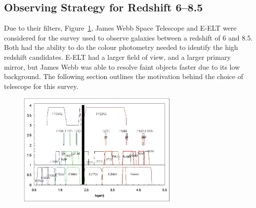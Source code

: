 
\subsection{Observing Strategy for Redshift 6--8.5} %
\label{sec:observing_strategy_for_redshift_6_8}
	Due to their filters, Figure~\ref{fig:JWST_NIRspec_filters}, James Webb Space Telescope and E-ELT were considered for the survey used to observe galaxies between a redshift of 6 and 8.5. Both had the ability to do the colour photometry needed to identify the high redshift candidates. E-ELT had a larger field of view, and a larger primary mirror, but James Webb was able to resolve faint objects faster due to its low background. The following section outlines the motivation behind the choice of telescope for this survey.
	\begin{figure}[!htbp]
		\centering
			\includegraphics[width=0.7\textwidth]{../Images/JWST_NIRspec_filters.jpeg}
		\caption{\label{fig:JWST_NIRspec_filters}}
	\end{figure}

